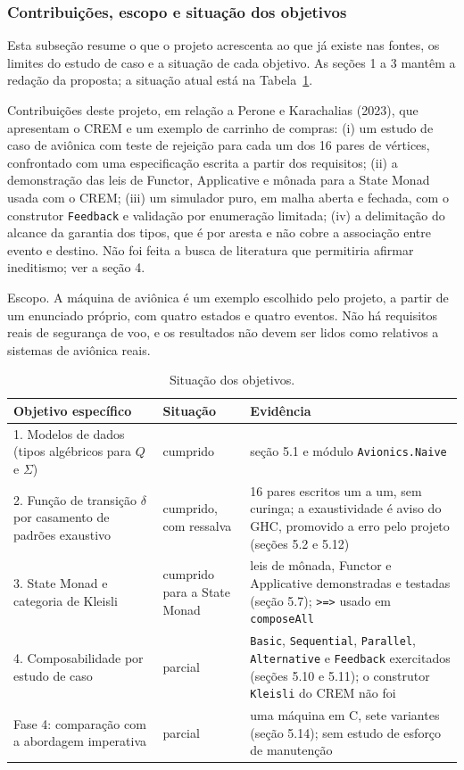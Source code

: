 \documentclass[12pt,a4paper]{article}
\begin{document}
\subsubsection{Contribuições, escopo e situação dos objetivos}

Esta subseção resume o que o projeto acrescenta ao que já existe nas fontes, os limites do estudo de caso e a situação de cada objetivo. As seções 1 a 3 mantêm a redação da proposta; a situação atual está na Tabela~\ref{tab:objetivos}.

Contribuições deste projeto, em relação a Perone e Karachalias (2023), que apresentam o CREM e um exemplo de carrinho de compras: (i) um estudo de caso de aviônica com teste de rejeição para cada um dos 16 pares de vértices, confrontado com uma especificação escrita a partir dos requisitos; (ii) a demonstração das leis de Functor, Applicative e mônada para a State Monad usada com o CREM; (iii) um simulador puro, em malha aberta e fechada, com o construtor \texttt{Feedback} e validação por enumeração limitada; (iv) a delimitação do alcance da garantia dos tipos, que é por aresta e não cobre a associação entre evento e destino. Não foi feita a busca de literatura que permitiria afirmar ineditismo; ver a seção 4.

Escopo. A máquina de aviônica é um exemplo escolhido pelo projeto, a partir de um enunciado próprio, com quatro estados e quatro eventos. Não há requisitos reais de segurança de voo, e os resultados não devem ser lidos como relativos a sistemas de aviônica reais.

\begin{table}[h]
\centering
\footnotesize
\begin{tabular}{|p{4.3cm}|p{2.1cm}|p{8.0cm}|}
\hline
Objetivo específico & Situação & Evidência \\
\hline
1. Modelos de dados (tipos algébricos para $Q$ e $\Sigma$) & cumprido & seção 5.1 e módulo \texttt{Avionics.Naive} \\
\hline
2. Função de transição $\delta$ por casamento de padrões exaustivo & cumprido, com ressalva & 16 pares escritos um a um, sem curinga; a exaustividade é aviso do GHC, promovido a erro pelo projeto (seções 5.2 e 5.12) \\
\hline
3. State Monad e categoria de Kleisli & cumprido para a State Monad & leis de mônada, Functor e Applicative demonstradas e testadas (seção 5.7); \texttt{>=>} usado em \texttt{composeAll} \\
\hline
4. Composabilidade por estudo de caso & parcial & \texttt{Basic}, \texttt{Sequential}, \texttt{Parallel}, \texttt{Alternative} e \texttt{Feedback} exercitados (seções 5.10 e 5.11); o construtor \texttt{Kleisli} do CREM não foi \\
\hline
Fase 4: comparação com a abordagem imperativa & parcial & uma máquina em C, sete variantes (seção 5.14); sem estudo de esforço de manutenção \\
\hline
\end{tabular}
\caption{Situação dos objetivos.}
\label{tab:objetivos}
\end{table}
\end{document}
